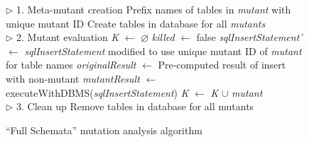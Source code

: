 
\begin{figure}[h]
\begin{algorithmic}
\footnotesize

\State $\triangleright$ 1. Meta-mutant creation
	\State Prefix names of tables in \emph{mutant} with unique mutant ID
\EndFor
\State Create tables in database for all \emph{mutants}
\\

\State $\triangleright$ 2. Mutant evaluation
\State \emph{K} $ \gets $ \emph{$\varnothing$}
	\State \emph{killed} $\gets$ false
		\State \emph{sqlInsertStatement'} $ \gets $ \emph{sqlInsertStatement} modified to use unique mutant ID of \emph{mutant} for table names 
		\State \emph{originalResult} $ \gets $ Pre-computed result of insert with non-mutant 
		\State \emph{mutantResult} $ \gets $ executeWithDBMS(\emph{sqlInsertStatement})
			\State \emph{K} $ \gets $ \emph{K} $\cup$ \emph{mutant}
		\EndIf
	\EndFor
\EndFor
\\

\State $\triangleright$ 3. Clean up
\State Remove tables in database for all mutants

\end{algorithmic}

\caption{\label{alg:original}``Full Schemata'' mutation analysis algorithm}
\vspace{-1em}
\end{figure}
